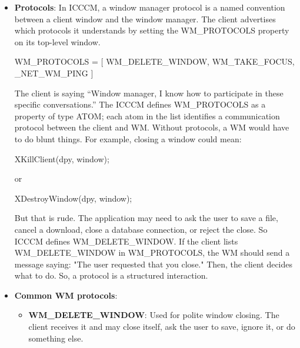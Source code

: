 \documentclass{report}
\begin{document}
\begin{itemize}
\begin{cppcode}
            \end{cppcode}
            \bigbreak \noindent 
            A dock/panel should usually be floating and not tiled. Its strut reserves screen space. Your tiling area should exclude that reserved space.
        \item \textbf{Protocols}: In ICCCM, a window manager protocol is a named convention between a client window and the window manager.
            \bigbreak \noindent 
            The client advertises which protocols it understands by setting the WM_PROTOCOLS property on its top-level window.
            \bigbreak \noindent 
            \begin{cppcode}
                WM_PROTOCOLS = [
                    WM_DELETE_WINDOW,
                    WM_TAKE_FOCUS,
                    _NET_WM_PING
                ]
            \end{cppcode}
            \bigbreak \noindent 
            The client is saying “Window manager, I know how to participate in these specific conversations.”
            \bigbreak \noindent 
            The ICCCM defines WM\_PROTOCOLS as a property of type ATOM; each atom in the list identifies a communication protocol between the client and WM.
            \bigbreak \noindent 
            Without protocols, a WM would have to do blunt things. For example, closing a window could mean:
            \bigbreak \noindent 
            \begin{cppcode}
            XKillClient(dpy, window);
            \end{cppcode}
            \bigbreak \noindent 
            or
            \bigbreak \noindent 
            \begin{cppcode}
            XDestroyWindow(dpy, window);
            \end{cppcode}
            \bigbreak \noindent 
            But that is rude. The application may need to ask the user to save a file, cancel a download, close a database connection, or reject the close.
            \bigbreak \noindent 
            So ICCCM defines WM\_DELETE\_WINDOW. If the client lists WM\_DELETE\_WINDOW in WM\_PROTOCOLS, the WM should send a message saying: "The user requested that you close." Then, the client decides what to do.
            \bigbreak \noindent 
            So, a protocol is a structured interaction.
    \item \textbf{Common WM protocols}: 
        \begin{itemize}
            \item \textbf{WM\_DELETE\_WINDOW}: Used for polite window closing. The client receives it and may close itself, ask the user to save, ignore it, or do something else. 

\end{itemize}
\end{itemize}
\end{document}
